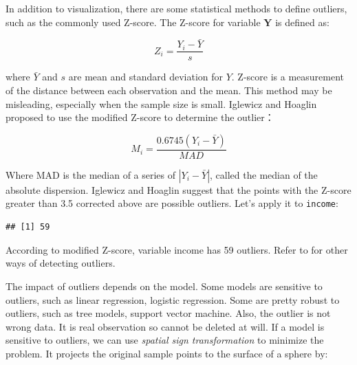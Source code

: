\documentclass[12pt,]{krantz}
\makeatletter
\newenvironment{Shaded}{\begin{snugshade}}{\end{snugshade}}
\newcommand{\CommentTok}[1]{\textcolor[rgb]{0.37,0.37,0.37}{\textit{#1}}}
\newcommand{\FloatTok}[1]{\textcolor[rgb]{0.06,0.06,0.06}{#1}}
\newcommand{\KeywordTok}[1]{\textcolor[rgb]{0.27,0.27,0.27}{\textbf{#1}}}
\newcommand{\NormalTok}[1]{#1}
\newcommand{\OperatorTok}[1]{\textcolor[rgb]{0.43,0.43,0.43}{\textbf{#1}}}
\newcommand{\StringTok}[1]{\textcolor[rgb]{0.5,0.5,0.5}{#1}}
\newenvironment{kframe}{%
\medskip{}
\setlength{\fboxsep}{.8em}
 \def\at@end@of@kframe{}%
 \ifinner\ifhmode%
  \def\at@end@of@kframe{\end{minipage}}%
  \begin{minipage}{\columnwidth}%
 \fi\fi%
 \def\FrameCommand##1{\hskip\@totalleftmargin \hskip-\fboxsep
 \colorbox{shadecolor}{##1}\hskip-\fboxsep
     \hskip-\linewidth \hskip-\@totalleftmargin \hskip\columnwidth}%
 \MakeFramed {\advance\hsize-\width
   \@totalleftmargin\z@ \linewidth\hsize
   \@setminipage}}%
 {\par\unskip\endMakeFramed%
 \at@end@of@kframe}
\renewenvironment{Shaded}{\begin{kframe}}{\end{kframe}}
\makeatother
\begin{document}
In addition to visualization, there are some statistical methods to define outliers, such as the commonly used Z-score. The Z-score for variable \(\mathbf{Y}\) is defined as:

\[Z_{i}=\frac{Y_{i}-\bar{Y}}{s}\]

where \(\bar{Y}\) and \(s\) are mean and standard deviation for \(Y\). Z-score is a measurement of the distance between each observation and the mean. This method may be misleading, especially when the sample size is small. Iglewicz and Hoaglin proposed to use the modified Z-score to determine the outlier\citep{mad1}：

\[M_{i}=\frac{0.6745(Y_{i}-\bar{Y})}{MAD}\]

Where MAD is the median of a series of \(|Y_ {i} - \bar{Y}|\), called the median of the absolute dispersion. Iglewicz and Hoaglin suggest that the points with the Z-score greater than 3.5 corrected above are possible outliers. Let's apply it to \texttt{income}:

\begin{Shaded}
\end{Shaded}

\begin{verbatim}
## [1] 59
\end{verbatim}

According to modified Z-score, variable income has 59 outliers. Refer to \citep{mad1} for other ways of detecting outliers.

The impact of outliers depends on the model. Some models are sensitive to outliers, such as linear regression, logistic regression. Some are pretty robust to outliers, such as tree models, support vector machine. Also, the outlier is not wrong data. It is real observation so cannot be deleted at will. If a model is sensitive to outliers, we can use \emph{spatial sign transformation} \citep{ssp} to minimize the problem. It projects the original sample points to the surface of a sphere by:
\end{document}
